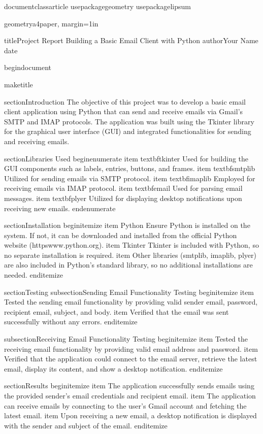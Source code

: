 documentclass{article}
usepackage{geometry}
usepackage{lipsum} %

geometry{a4paper, margin=1in}

title{Project Report Building a Basic Email Client with Python}
author{Your Name}
date{}

begin{document}

maketitle

section{Introduction}
The objective of this project was to develop a basic email client application using Python that can send and receive emails via Gmail's SMTP and IMAP protocols. The application was built using the Tkinter library for the graphical user interface (GUI) and integrated functionalities for sending and receiving emails.

section{Libraries Used}
begin{enumerate}
    item textbf{tkinter} Used for building the GUI components such as labels, entries, buttons, and frames.
    item textbf{smtplib} Utilized for sending emails via SMTP protocol.
    item textbf{imaplib} Employed for receiving emails via IMAP protocol.
    item textbf{email} Used for parsing email messages.
    item textbf{plyer} Utilized for displaying desktop notifications upon receiving new emails.
end{enumerate}

section{Installation}
begin{itemize}
    item Python Ensure Python is installed on the system. If not, it can be downloaded and installed from the official Python website (httpswww.python.org).
    item Tkinter Tkinter is included with Python, so no separate installation is required.
    item Other libraries (smtplib, imaplib, plyer) are also included in Python's standard library, so no additional installations are needed.
end{itemize}

section{Testing}
subsection{Sending Email Functionality Testing}
begin{itemize}
    item Tested the sending email functionality by providing valid sender email, password, recipient email, subject, and body. 
    item Verified that the email was sent successfully without any errors.
end{itemize}

subsection{Receiving Email Functionality Testing}
begin{itemize}
    item Tested the receiving email functionality by providing valid email address and password.
    item Verified that the application could connect to the email server, retrieve the latest email, display its content, and show a desktop notification.
end{itemize}

section{Results}
begin{itemize}
    item The application successfully sends emails using the provided sender's email credentials and recipient email.
    item The application can receive emails by connecting to the user's Gmail account and fetching the latest email.
    item Upon receiving a new email, a desktop notification is displayed with the sender and subject of the email.
end{itemize}

